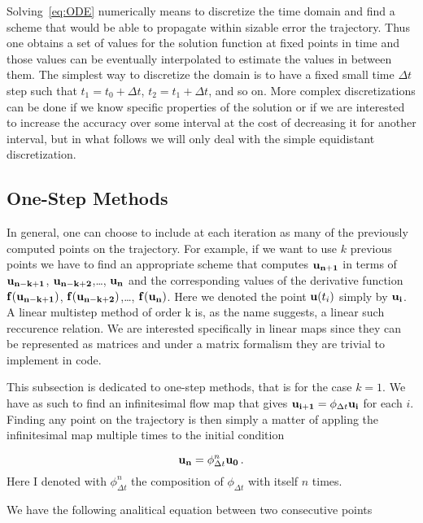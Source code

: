 \documentclass[12pt, class=report, crop=false]{standalone}
\begin{document}
Solving~\cref{eq:ODE} numerically means to discretize the time domain and find a scheme that would be able to propagate within sizable error the trajectory. Thus one obtains a set of values for the solution function at fixed points in time and those values can be eventually interpolated to estimate the values in between them. The simplest way to discretize the domain is to have a fixed small time \(\Delta t\) step such that \(t_1=t_0 + \Delta t\), \(t_2=t_1 + \Delta t\), and so on. More complex discretizations can be done if we know specific properties of the solution or if we are interested to increase the accuracy over some interval at the cost of decreasing it for another interval, but in what follows we will only deal with the simple equidistant discretization.

\subsection{One-Step Methods}
\label{ssec:one-step-m}

In general, one can choose to include at each iteration as many of the previously computed points on the trajectory. For example, if we want to use \(k\) previous points we have to find an appropriate scheme that computes \(\vb{u_{n+1}}\)  in terms of \(\vb{u_{n-k+1}}\), \(\vb{u_{n-k+2}}\),\dots, \(\vb{u_{n}}\) and the corresponding values of the derivative function \(\vb{f}(\vb{u_{n-k+1}})\), \(\vb{f}(\vb{u_{n-k+2}})\),\dots, \(\vb{f}(\vb{u_{n}})\). Here we denoted the point \(\vb{u}(t_i)\) simply by \(\vb{u_i}\). A linear multistep method of order k is, as the name suggests, a linear such reccurence relation. We are interested specifically in linear maps since they can be represented as matrices and under a matrix formalism they are trivial to implement in code.

This subsection is dedicated to one-step methods, that is for the case \(k=1\). We have as such to find an infinitesimal flow map that gives \(\vb{u_{i+1}} = \phi_{\Delta t} \vb{u_{i}}\) for each \(i\). Finding any point on the trajectory is then simply a matter of appling the infinitesimal map multiple times to the initial condition

\begin{equation*}
  \vb{u_{n}} = \phi_{\Delta t}^n \vb{u_{0}}\,.
\end{equation*}
Here I denoted with \(\phi_{\Delta t}^n\) the composition of \(\phi_{\Delta t}\) with itself \(n\) times.

We have the following analitical equation between two consecutive points
\end{document}
